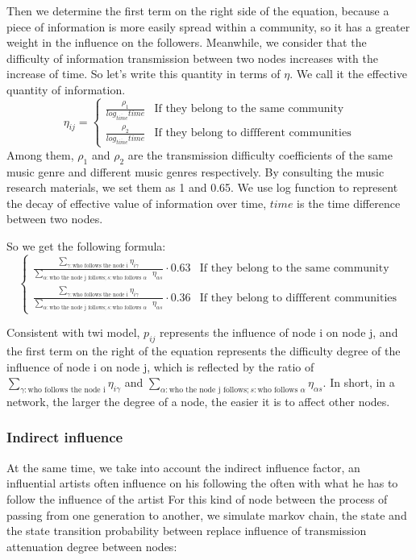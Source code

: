\documentclass[12pt]{article}  %
\begin{document}
Then we determine the first term on the right side of the equation, because a piece of information is more easily spread within a community, so it has a greater weight in the influence on the followers. Meanwhile, we consider that the difficulty of information transmission between two nodes increases with the increase of time. So let's write this quantity in terms of $\eta $.
We call it the effective quantity of information.
\begin{equation}
\eta_{ij}=
\begin{cases}
\frac{\rho_1}{log_{\overline{time}}time} &\text{If they belong to the same community}\\
\frac{\rho_2}{log_{\overline{time}}time} &\text{If they belong to diffferent communities}
\end{cases}
\end{equation}
Among them, $\rho _1$ and $\rho _2$ are the transmission difficulty coefficients of the same music genre and different music genres respectively. 
By consulting the music research materials, we set them as 1 and 0.65.
We use log function to represent the decay of effective value of information over time, $time$ is the time difference between two nodes.

So we get the following formula: 
\begin{equation}
\begin{cases}
\frac{\sum_{\gamma :\text{who follows the node i}} \eta _{i\gamma }}{\sum_{\alpha :\text{who the node j follows}; s:\text{who follows $\alpha$ }}  \eta _{\alpha s}}\cdot 0.63 &\text{If they belong to the same community} \\
\frac{\sum_{\gamma :\text{who follows the node i}} \eta _{i\gamma }}{\sum_{\alpha :\text{who the node j follows}; s:\text{who follows $\alpha$ }}  \eta _{\alpha s}}\cdot 0.36 &\text{If they belong to diffferent communities}
\end{cases}
\end{equation}

Consistent with twi model, $p_{ij}$ represents the influence of node i on node j, and the first term on the right of the equation represents the difficulty degree of the influence of node i on node j, which is reflected by the ratio of $\sum_{\gamma :\text{who follows the node i}} \eta _{i\gamma }$ and $\sum_{\alpha  :\text{who the node j follows};s:\text{who follows $\alpha $}} \eta _{\alpha s }$. In short, in a network, the larger the degree of a node, the easier it is to affect other nodes.

\subsubsection{Indirect influence}
At the same time, we take into account the indirect influence factor, an influential artists often influence on his following the often with what he has to follow the influence of the artist For this kind of node between the process of passing from one generation to another, we simulate markov chain, the state and the state transition probability between replace influence of transmission attenuation degree between nodes:
\end{document}
